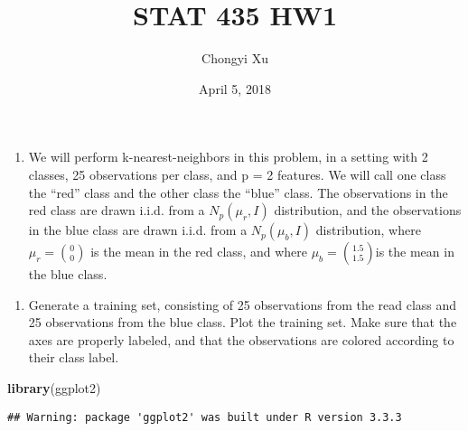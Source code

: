 \documentclass[]{article}
\title{STAT 435 HW1}
\author{Chongyi Xu}
\date{April 5, 2018}
\newenvironment{Shaded}{\begin{snugshade}}{\end{snugshade}}
\newcommand{\KeywordTok}[1]{\textcolor[rgb]{0.13,0.29,0.53}{\textbf{#1}}}
\newcommand{\NormalTok}[1]{#1}
\providecommand{\tightlist}{%
  \setlength{\itemsep}{0pt}\setlength{\parskip}{0pt}}
\begin{document}
\maketitle

\begin{enumerate}
\def\labelenumi{\arabic{enumi}.}
\tightlist
\item
  We will perform k-nearest-neighbors in this problem, in a setting with
  2 classes, 25 observations per class, and p = 2 features. We will call
  one class the ``red'' class and the other class the ``blue'' class.
  The observations in the red class are drawn i.i.d. from a
  \(N_p(\mu_r, I)\) distribution, and the observations in the blue class
  are drawn i.i.d. from a \(N_p(\mu_b, I)\) distribution, where
  \(\mu_r =\binom{0}{0}\) is the mean in the red class, and where
  \(\mu_b = \binom{1.5}{1.5}\)is the mean in the blue class.
\end{enumerate}

\begin{enumerate}
\def\labelenumi{(\alph{enumi})}
\tightlist
\item
  Generate a training set, consisting of 25 observations from the read
  class and 25 observations from the blue class. Plot the training set.
  Make sure that the axes are properly labeled, and that the
  observations are colored according to their class label.
\end{enumerate}

\begin{Shaded}
\begin{Highlighting}[]
\KeywordTok{library}\NormalTok{(ggplot2)}
\end{Highlighting}
\end{Shaded}

\begin{verbatim}
## Warning: package 'ggplot2' was built under R version 3.3.3
\end{verbatim}
\end{document}
